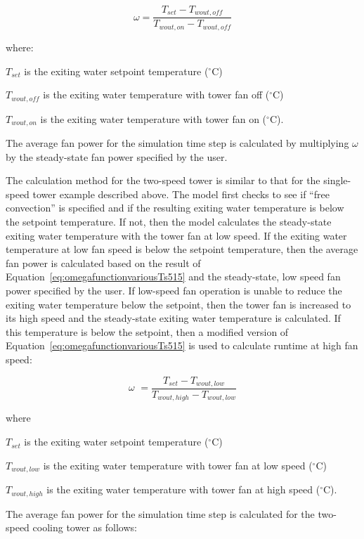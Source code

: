 \begin{equation}
\omega = \frac{{{T_{set}} - {T_{wout,off}}}}{{{T_{wout,on}} - {T_{wout,off}}}}
\label{eq:omegafunctionvariousTs515}
\end{equation}

where:

\({T_{set}}\) is the exiting water setpoint temperature (\(^{\circ}\)C)

\({T_{wout,off}}\) is the exiting water temperature with tower fan off (\(^{\circ}\)C)

\({T_{wout,on}}\) is the exiting water temperature with tower fan on (\(^{\circ}\)C).

The average fan power for the simulation time step is calculated by multiplying \(\omega\) by the steady-state fan power specified by the user.

The calculation method for the two-speed tower is similar to that for the single-speed tower example described above. The model first checks to see if ``free convection'' is specified and if the resulting exiting water temperature is below the setpoint temperature. If not, then the model calculates the steady-state exiting water temperature with the tower fan at low speed. If the exiting water temperature at low fan speed is below the setpoint temperature, then the average fan power is calculated based on the result of Equation~\ref{eq:omegafunctionvariousTs515} and the steady-state, low speed fan power specified by the user. If low-speed fan operation is unable to reduce the exiting water temperature below the setpoint, then the tower fan is increased to its high speed and the steady-state exiting water temperature is calculated. If this temperature is below the setpoint, then a modified version of Equation~\ref{eq:omegafunctionvariousTs515} is used to calculate runtime at high fan speed:

\begin{equation}
\omega \,\, = \frac{{{T_{set}} - {T_{wout,low}}}}{{{T_{wout,high}} - {T_{wout,low}}}}
\end{equation}

where

\({T_{set}}\) is the exiting water setpoint temperature (\(^{\circ}\)C)

\({T_{wout,low}}\) is the exiting water temperature with tower fan at low speed (\(^{\circ}\)C)

\({T_{wout,high}}\) is the exiting water temperature with tower fan at high speed (\(^{\circ}\)C).

The average fan power for the simulation time step is calculated for the two-speed cooling tower as follows:

